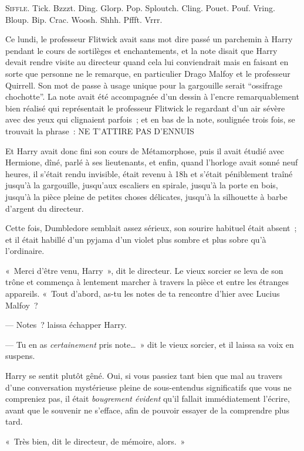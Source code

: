 
\lettrine{S}{iffle}.
 Tick. Bzzzt.
Ding. Glorp.
Pop. Sploutch.
Cling. Pouet.
Pouf. Vring.
Bloup. Bip.
Crac. Woosh.
Shhh. Pffft.
Vrrr.

Ce lundi, le professeur Flitwick avait sans mot dire passé un parchemin à Harry pendant le cours de sortilèges et enchantements, et la note disait que Harry devait rendre visite au directeur quand cela lui conviendrait mais en faisant en sorte que personne ne le remarque, en particulier Drago Malfoy et le professeur Quirrell.
Son mot de passe à usage unique pour la gargouille serait “ossifrage chochotte”.
La note avait été accompagnée d'un dessin à l'encre remarquablement bien réalisé qui représentait le professeur Flitwick le regardant d'un air sévère avec des yeux qui clignaient parfois~; et en bas de la note, soulignée trois fois, se trouvait la phrase~: NE T'ATTIRE PAS D'ENNUIS

Et Harry avait donc fini son cours de Métamorphose, puis il avait étudié avec Hermione, dîné, parlé à ses lieutenants, et enfin, quand l'horloge avait sonné neuf heures, il s'était rendu invisible, était revenu à 18h et s'était péniblement traîné jusqu'à la gargouille, jusqu'aux escaliers en spirale, jusqu'à la porte en bois, jusqu'à la pièce pleine de petites choses délicates, jusqu'à la silhouette à barbe d'argent du directeur.

Cette fois, Dumbledore semblait assez sérieux, son sourire habituel était absent~; et il était habillé d'un pyjama d'un violet plus sombre et plus sobre qu'à l'ordinaire.

«~Merci d'être venu, Harry~», dit le directeur.
Le vieux sorcier se leva de son trône et commença à lentement marcher à travers la pièce et entre les étranges appareils.
«~Tout d'abord, as-tu les notes de ta rencontre d'hier avec Lucius Malfoy~?

--- Notes~? laissa échapper Harry.

--- Tu en as \emph{certainement} pris note…~»
dit le vieux sorcier, et il laissa sa voix en suspens.

Harry se sentit plutôt gêné.
Oui, si vous passiez tant bien que mal au travers d'une conversation mystérieuse pleine de sous-entendus significatifs que vous ne compreniez pas, il était \emph{bougrement évident} qu'il fallait immédiatement l'écrire, avant que le souvenir ne s'efface, afin de pouvoir essayer de la comprendre plus tard.

«~Très bien, dit le directeur, de mémoire, alors.~»

